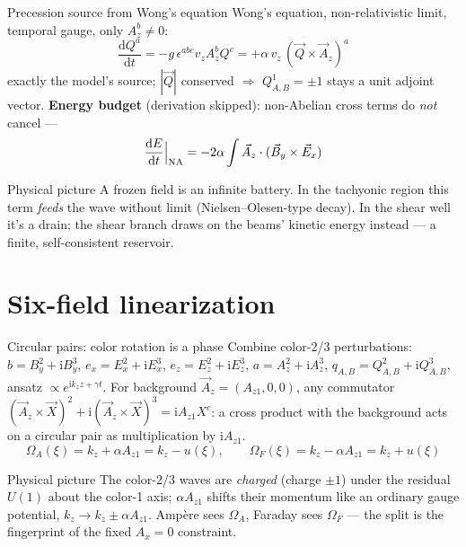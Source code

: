 \documentclass[aspectratio=169,11pt]{beamer}
\newenvironment{physpicture}{\begin{exampleblock}{Physical picture}}{\end{exampleblock}}
\newcommand{\kz}{k_z}
\newcommand{\OmA}{\Omega_A}
\newcommand{\OmF}{\Omega_F}
\newcommand{\Az}{A_{z1}}
\newcommand{\ii}{\mathrm{i}}
\newcommand{\dd}{\mathrm{d}}
\begin{document}
\begin{frame}{Precession source from Wong's equation}
\footnotesize
Wong's equation, non-relativistic limit, temporal gauge, only $A_z^b\neq0$:
\[
\frac{\dd Q^a}{\dd t}=-g\,\epsilon^{abc}v_zA_z^b Q^c
=+\alpha\,v_z\,(\vec Q\times\vec A_z)^a
\]
exactly the model's source; $|\vec Q|$ conserved $\Rightarrow$ $Q^1_{A,B}=\pm1$
stays a unit adjoint vector.
\vspace{0.1em}
\textbf{Energy budget} (derivation skipped): non-Abelian cross terms do \emph{not}
cancel —
\[
\frac{\dd E}{\dd t}\Big|_{\rm NA}=-2\alpha\int\vec A_z\cdot(\vec B_y\times\vec E_x)
\]
\begin{physpicture}
A frozen field is an infinite battery. In the tachyonic region this term
\emph{feeds} the wave without limit (Nielsen--Olesen-type decay). In the shear
well it's a drain; the shear branch draws on the beams' kinetic energy instead —
a finite, self-consistent reservoir.
\end{physpicture}
\end{frame}

\section{Six-field linearization}

\begin{frame}{Circular pairs: color rotation is a phase}
Combine color-2/3 perturbations: $b=B_y^2+\ii B_y^3$, $e_x=E_x^2+\ii E_x^3$,
$e_z=E_z^2+\ii E_z^3$, $a=A_z^2+\ii A_z^3$, $q_{A,B}=Q^2_{A,B}+\ii Q^3_{A,B}$, ansatz
$\propto e^{\ii\kz z+\gamma t}$. For background $\vec A_z=(\Az,0,0)$, any
commutator $(\vec A_z\times\vec X)^2+\ii(\vec A_z\times\vec X)^3=\ii\Az X^c$: a
cross product with the background acts on a circular pair as multiplication by
$\ii\Az$.
\[
\boxed{\;\OmA(\xi)=\kz+\alpha\Az=\kz-u(\xi),\qquad \OmF(\xi)=\kz-\alpha\Az=\kz+u(\xi)\;}
\]
\begin{physpicture}
The color-2/3 waves are \emph{charged} (charge $\pm1$) under the residual $U(1)$
about the color-1 axis; $\alpha\Az$ shifts their momentum like an ordinary gauge
potential, $\kz\to\kz\pm\alpha\Az$. Amp\`ere sees $\OmA$, Faraday sees $\OmF$ — the
split is the fingerprint of the fixed $A_x=0$ constraint.
\end{physpicture}
\end{frame}
\end{document}
